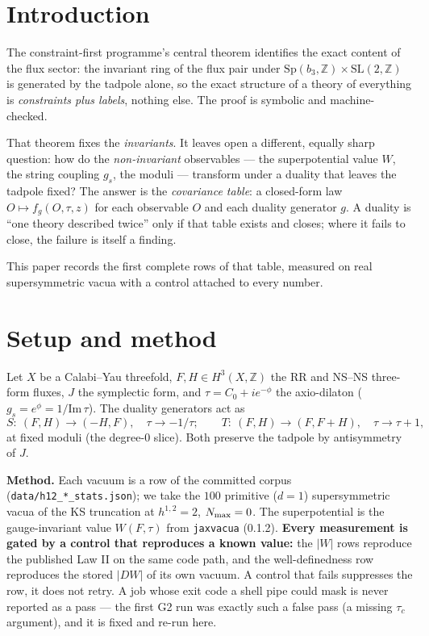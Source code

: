 \documentclass[11pt]{article}
\newcommand{\bthree}{b_3}
\newcommand{\flux}{F}
\newcommand{\hh}{H}
\newcommand{\tauu}{\tau}
\begin{document}
\section{Introduction}

The constraint-first programme's central theorem \cite{constraint-first} identifies the
exact content of the flux sector: the invariant ring of the flux pair under
$\mathrm{Sp}(\bthree,\mathbb{Z})\times\mathrm{SL}(2,\mathbb{Z})$ is generated by the
tadpole alone, so the exact structure of a theory of everything is \emph{constraints
plus labels}, nothing else. The proof is symbolic and machine-checked.

That theorem fixes the \emph{invariants}. It leaves open a different, equally sharp
question: how do the \emph{non-invariant} observables --- the superpotential value
$W$, the string coupling $g_s$, the moduli --- transform under a duality that leaves
the tadpole fixed? The answer is the \emph{covariance table}: a closed-form law
$O\mapsto f_g(O,\tau,z)$ for each observable $O$ and each duality generator $g$. A
duality is ``one theory described twice'' only if that table exists and closes; where
it fails to close, the failure is itself a finding.

This paper records the first complete rows of that table, measured on real
supersymmetric vacua with a control attached to every number.

\section{Setup and method}

Let $X$ be a Calabi--Yau threefold, $\flux,\hh\in H^3(X,\mathbb{Z})$ the RR and NS--NS
three-form fluxes, $J$ the symplectic form, and $\tauu=C_0+i e^{-\phi}$ the
axio-dilaton ($g_s=e^{\phi}=1/\mathrm{Im}\,\tauu$). The duality generators act as
\begin{equation}
  S:\ (\flux,\hh)\to(-\hh,\flux),\quad \tauu\to-1/\tauu;
  \qquad
  T:\ (\flux,\hh)\to(\flux,\flux+\hh),\quad \tauu\to\tauu+1,
\end{equation}
at fixed moduli (the degree-0 slice). Both preserve the tadpole by antisymmetry of
$J$.

\textbf{Method.} Each vacuum is a row of the committed corpus
(\texttt{data/h12\_*\_stats.json}); we take the $100$ primitive ($d=1$) supersymmetric
vacua of the KS truncation at $h^{1,2}=2$, $N_{\rm max}=0$. The superpotential is the
gauge-invariant value $W(\flux,\tauu)$ from \texttt{jaxvacua} (0.1.2). \textbf{Every
measurement is gated by a control that reproduces a known value:} the $|W|$ rows
reproduce the published Law II on the same code path, and the well-definedness row
reproduces the stored $|DW|$ of its own vacuum. A control that fails suppresses the
row, it does not retry. A job whose exit code a shell pipe could mask is never
reported as a pass --- the first G2 run was exactly such a false pass (a missing
$\tauu_c$ argument), and it is fixed and re-run here.
\end{document}
